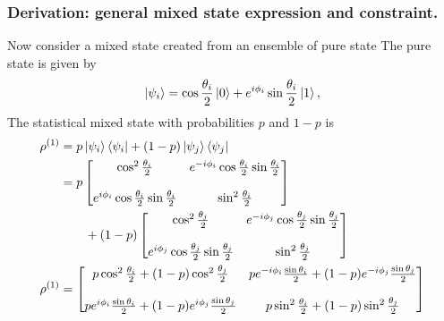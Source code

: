 \documentclass[../../../main.tex]{subfiles}
\begin{document}
\subsubsection{Derivation: general mixed state expression and constraint.}
Now consider a mixed state created from an ensemble of pure state
The pure state is given by
\begin{equation*}
  \ket{\psi_i}
  =
  \cos\frac{\theta_i}{2}\ket{0}
  +
  e^{i\phi_i}\sin\frac{\theta_i}{2}\ket{1},
\end{equation*}
The statistical mixed state with probabilities \(p\) and \(1-p\) is
\begin{align*}
  \rho^{(1)}
             & =
  p\ket{\psi_i}\bra{\psi_i}
  +
  (1-p)\ket{\psi_j}\bra{\psi_j}                              \\
             & =
  p
  \begin{bmatrix}
    \cos^2\frac{\theta_i}{2}
     &
    e^{-i\phi_i}\cos\frac{\theta_i}{2}\sin\frac{\theta_i}{2} \\\\
    e^{i\phi_i}\cos\frac{\theta_i}{2}\sin\frac{\theta_i}{2}
     &
    \sin^2\frac{\theta_i}{2}
  \end{bmatrix} \\
             & \qquad
  +(1-p)
  \begin{bmatrix}
    \cos^2\frac{\theta_j}{2}
     &
    e^{-i\phi_j}\cos\frac{\theta_j}{2}\sin\frac{\theta_j}{2} \\\\
    e^{i\phi_j}\cos\frac{\theta_j}{2}\sin\frac{\theta_j}{2}
     &
    \sin^2\frac{\theta_j}{2}
  \end{bmatrix} \\
  \rho^{(1)} & =
  \begin{bmatrix}
    p\cos^2\frac{\theta_i}{2}
    +(1-p)\cos^2\frac{\theta_j}{2}
     &
    p e^{-i\phi_i}\frac{\sin \theta_i}{2}
    +(1-p)e^{-i\phi_j}\frac{\sin \theta_j}{2}
    \\\\
    p e^{i\phi_i}\frac{\sin \theta_i}{2}
    +(1-p)e^{i\phi_j}\frac{\sin \theta_j}{2}
     &
    p\sin^2\frac{\theta_i}{2}
    +(1-p)\sin^2\frac{\theta_j}{2}
  \end{bmatrix}
\end{align*}
\end{document}
